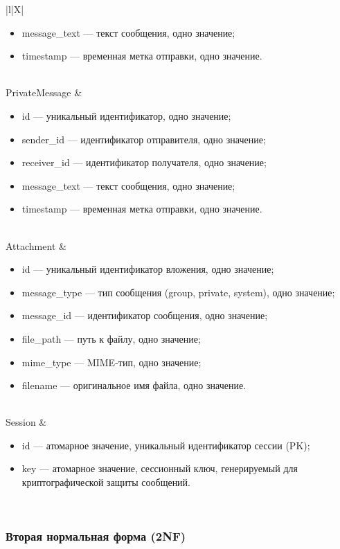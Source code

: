 \begin{xltabular}{\linewidth}{|l|X|}
\begin{itemize}[leftmargin=*]
		\item message\_text — текст сообщения, одно значение;
		\item timestamp — временная метка отправки, одно значение.
	\end{itemize} \\ \hline
	PrivateMessage &
	\begin{itemize}[leftmargin=*]
		\item id — уникальный идентификатор, одно значение;
		\item sender\_id — идентификатор отправителя, одно значение;
		\item receiver\_id — идентификатор получателя, одно значение;
		\item message\_text — текст сообщения, одно значение;
		\item timestamp — временная метка отправки, одно значение.
	\end{itemize} \\ \hline
	Attachment &
	\begin{itemize}[leftmargin=*]
		\item id — уникальный идентификатор вложения, одно значение;
		\item message\_type — тип сообщения (group, private, system), одно значение;
		\item message\_id — идентификатор сообщения, одно значение;
		\item file\_path — путь к файлу, одно значение;
		\item mime\_type — MIME-тип, одно значение;
		\item filename — оригинальное имя файла, одно значение.
	\end{itemize} \\ \hline
	Session &
	\begin{itemize}[leftmargin=*]
		\item id — атомарное значение, уникальный идентификатор сессии (PK);
		\item key — атомарное значение, сессионный ключ, генерируемый для криптографической защиты сообщений.
	\end{itemize} \\ \hline
\end{xltabular}

\bigskip

\subsubsection{Вторая нормальная форма (2NF)}

